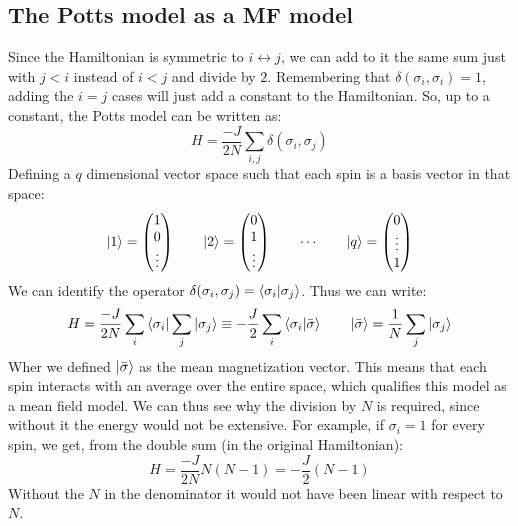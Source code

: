 \documentclass{article}
\begin{document}
\subsection{The Potts model as a MF model}
Since the Hamiltonian is symmetric to $i \leftrightarrow j$, we can add to it the same sum just with $j < i$ instead of $i < j$ and divide by $2$. Remembering that $\delta(\sigma_i, \sigma_i) = 1$, adding the $i = j$ cases will just add a constant to the Hamiltonian. So, up to a constant, the Potts model can be written as:
\begin{equation}
    H = \frac{-J}{2N} \sum_{i, j} \delta(\sigma_i, \sigma_j)
\end{equation}
Defining a $q$ dimensional vector space such that each spin is a basis vector in that space:
\begin{equation}
    \ket{1} = \begin{pmatrix}
        1 \\ 0 \\ \vdots
    \end{pmatrix}
    \qquad
    \ket{2} = \begin{pmatrix}
        0 \\ 1 \\ \vdots
    \end{pmatrix}
    \qquad
    \cdots
    \qquad
    \ket{q} = \begin{pmatrix}
        0 \\ \vdots \\ 1
    \end{pmatrix}
\end{equation}
We can identify the operator $\delta(\sigma_i, \sigma_j) = \braket{\sigma_i}{\sigma_j}$. Thus we can write:
\begin{equation}
    H = \frac{-J}{2N}\sum_i \bra{\sigma_i}\sum_j \ket{\sigma_j} \equiv -\frac{J}{2}\sum_i \braket{\sigma_i}{\bar{\sigma}}
    \qquad
    \ket{\bar{\sigma}} = \frac{1}{N}\sum_j \ket{\sigma_j}
\end{equation}
Wher we defined $\ket{\bar{\sigma}}$ as the mean magnetization vector. This means that each spin interacts with an average over the entire space, which qualifies this model as a mean field model.
\newline
We can thus see why the division by $N$ is required, since without it the energy would not be extensive. For example, if $\sigma_i = 1$ for every spin, we get, from the double sum (in the original Hamiltonian):
\begin{equation}
    H = \frac{-J}{2N}N(N-1) = -\frac{J}{2}(N-1)
\end{equation}
Without the $N$ in the denominator it would not have been linear with respect to $N$.
\end{document}
